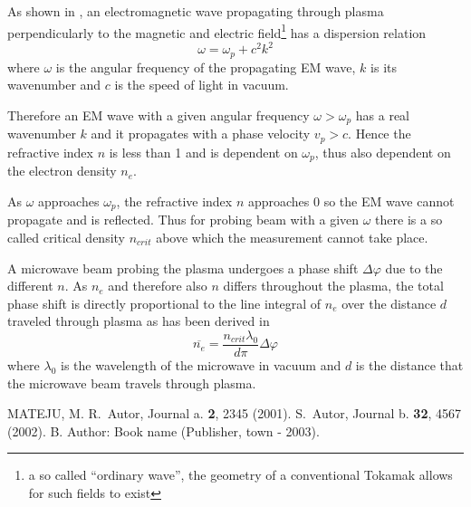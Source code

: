 \documentclass[twoside]{articlek}
\begin{document}
As shown in \cite{mateju}, an electromagnetic wave propagating through plasma perpendicularly to the magnetic and electric field\footnote{a so called ``ordinary wave'', the geometry of a conventional Tokamak allows for such fields to exist} has a dispersion relation
\begin{equation}
    \omega = \omega_p +c^2 k^2
    \label{eq:dispersion}
\end{equation}
where $\omega$ is the angular frequency of the propagating EM wave, $k$ is its wavenumber and $c$ is the speed of light in vacuum.

Therefore an EM wave with a given angular frequency $\omega>\omega_p$ has a real wavenumber $k$ and it propagates with a phase velocity $v_p>c$. Hence the refractive index $n$ is less than 1 and is dependent on $\omega_p$, thus also dependent on the electron density $n_e$. 

As $\omega$ approaches $\omega_p$, the refractive index $n$ approaches 0 so the EM wave cannot propagate and is reflected. Thus for probing beam with a given $\omega$ there is a so called critical density $n_{crit}$ above which the measurement cannot take place.


A microwave beam probing the plasma undergoes a phase shift $\Delta \varphi$ due to the different $n$.  %
As $n_e$ and therefore also $n$ differs throughout the plasma, the total phase shift is directly proportional to the line integral of $n_e$ over the distance $d$ traveled through plasma as has been derived in \cite{mateju}
\begin{equation}
    \overline{n_e}=\frac{ n_{crit}\lambda_0 }{d \pi}\Delta \varphi
    \label{eq:ne}
\end{equation}
where $\lambda_0$ is the wavelength of the microwave in vacuum and $d$ is the distance that the microwave beam travels through plasma. 
\begin{thebibliography}{99}

\leftskip=-5pt \vspace{-0.3truecm}
 MATEJU, M.
 R.~Autor, Journal a. {\bf 2}, 2345 (2001).
 S.~Autor, Journal b. {\bf 32}, 4567 (2002).
 B. Author: Book name (Publisher, town - 2003).
\end{thebibliography}
\end{document}
